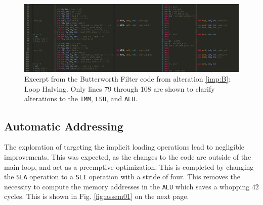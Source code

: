 \documentclass[letterpaper, 10 pt, conference]{ieeeconf}  %
\begin{document}
\begin{figure}[ht]
\begin{center}
\includegraphics[width=\linewidth]{images/assem02.png}
\caption{Excerpt from the Butterworth Filter code from alteration \ref{imp:B}: Loop Halving. Only lines 79 through 108 are shown to clarify alterations to the \texttt{IMM}, \texttt{LSU}, and \texttt{ALU}.}
\label{fig:assem02}
\end{center}
\end{figure}

\subsection{Automatic Addressing}
\label{imp:C}

The exploration of targeting the implicit loading operations lead to negligible improvements. This was expected, as the changes to the code are outside of the main loop, and act as a preemptive optimization. This is completed by changing the \texttt{SLA} operation to a \texttt{SLI} operation with a stride of four. This removes the necessity to compute the memory addresses in the \texttt{ALU} which saves a whopping $42$ cycles. This is shown in Fig. \ref{fig:assem01} on the next page.
\end{document}
